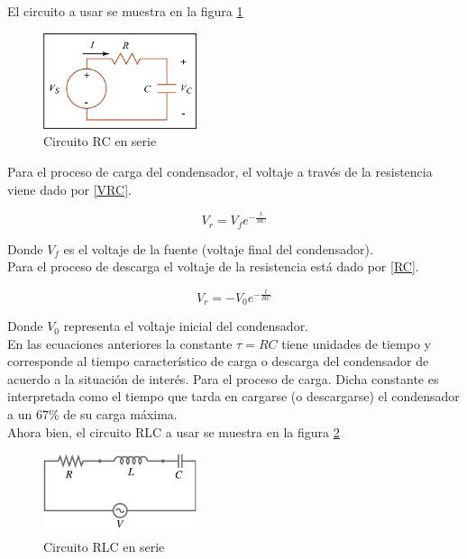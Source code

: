\documentclass[prb,aps,twocolumn,preprintnumbers,amsmath,amssymb]{revtex4}
\begin{document}
El circuito a usar se muestra en la figura \ref{fig: RC}

\begin{figure}[h!]
	\centering
	\includegraphics[width=0.4\textwidth]{RC}
	\caption{Circuito RC en serie}
	\label{fig: RC}
\end{figure} 

Para el proceso de carga del condensador, el voltaje a través de la resistencia viene dado por \eqref{VRC}.

\begin{equation}
\label{VRC}
V_{r} = V_{f}e^{-\frac{t}{RC}}
\end{equation}

Donde $V_{f}$ es el voltaje de la fuente (voltaje final del condensador).\\

Para el proceso de descarga el voltaje de la resistencia está dado por \eqref{RC}.

\begin{equation}
\label{RC}
V_{r} = -V_{0}e^{-\frac{t}{RC}}
\end{equation}

Donde $V_{0}$ representa el voltaje inicial del condensador.\\

En las ecuaciones anteriores la constante $\tau = RC$ tiene unidades de tiempo y corresponde al tiempo característico de carga o descarga del condensador de acuerdo a la situación de interés. Para el proceso de carga. Dicha constante es interpretada como el tiempo que tarda en cargarse (o descargarse) el condensador a un $67\%$ de su carga máxima.\\

Ahora bien, el circuito RLC a usar se muestra en la figura \ref{fig: RLC}

\begin{figure}[h!]
	\centering
	\includegraphics[width=0.4\textwidth]{RLC}
	\caption{Circuito RLC en serie}
	\label{fig: RLC}
\end{figure}
\end{document}
